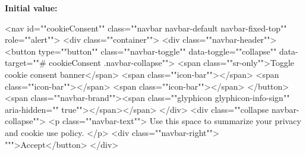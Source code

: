 {\bfseries Initial value\+:}
\begin{DoxyCode}
    <nav \textcolor{keywordtype}{id}=\textcolor{stringliteral}{""}cookieConsent\textcolor{stringliteral}{""} \textcolor{keyword}{class}=\textcolor{stringliteral}{""}navbar navbar-\textcolor{keywordflow}{default} navbar-fixed-top\textcolor{stringliteral}{""} role=\textcolor{stringliteral}{""}alert\textcolor{stringliteral}{""}>
        <div \textcolor{keyword}{class}=\textcolor{stringliteral}{""}container\textcolor{stringliteral}{""}>
            <div \textcolor{keyword}{class}=\textcolor{stringliteral}{""}navbar-header\textcolor{stringliteral}{""}>
                <button type=\textcolor{stringliteral}{""}button\textcolor{stringliteral}{""} \textcolor{keyword}{class}=\textcolor{stringliteral}{""}navbar-toggle\textcolor{stringliteral}{""} data-toggle=\textcolor{stringliteral}{""}collapse\textcolor{stringliteral}{""} data-target=\textcolor{stringliteral}{""}#
      cookieConsent .navbar-collapse\textcolor{stringliteral}{""}>
                    <span \textcolor{keyword}{class}=\textcolor{stringliteral}{""}sr-only\textcolor{stringliteral}{""}>Toggle cookie consent banner</span>
                    <span \textcolor{keyword}{class}=\textcolor{stringliteral}{""}icon-bar\textcolor{stringliteral}{""}></span>
                    <span \textcolor{keyword}{class}=\textcolor{stringliteral}{""}icon-bar\textcolor{stringliteral}{""}></span>
                    <span \textcolor{keyword}{class}=\textcolor{stringliteral}{""}icon-bar\textcolor{stringliteral}{""}></span>
                </button>
                <span \textcolor{keyword}{class}=\textcolor{stringliteral}{""}navbar-brand\textcolor{stringliteral}{""}><span \textcolor{keyword}{class}=\textcolor{stringliteral}{""}glyphicon glyphicon-info-sign\textcolor{stringliteral}{""} aria-hidden=\textcolor{stringliteral}{""}\textcolor{keyword}{
      true}\textcolor{stringliteral}{""}></span></span>
            </div>
            <div \textcolor{keyword}{class}=\textcolor{stringliteral}{""}collapse navbar-collapse\textcolor{stringliteral}{""}>
                <p \textcolor{keyword}{class}=\textcolor{stringliteral}{""}navbar-text\textcolor{stringliteral}{""}>
                    Use \textcolor{keyword}{this} space to summarize your privacy and cookie use policy.
                </p>
                <div \textcolor{keyword}{class}=\textcolor{stringliteral}{""}navbar-right\textcolor{stringliteral}{""}>
                    \textcolor{stringliteral}{""}\textcolor{stringliteral}{">Accept</button>}
\textcolor{stringliteral}{                </div>}

\end{DoxyCode}
